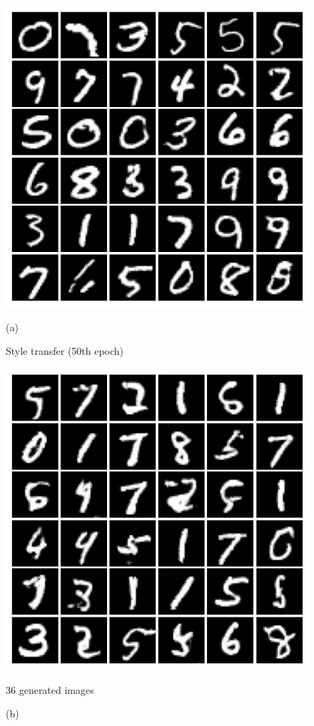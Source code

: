 \documentclass{article}
\begin{document}
\begin{figure}[hbt]
	\centering
	\begin{minipage}{.5\textwidth}
		\centering
		\includegraphics[width=.8\linewidth]{images/mnist_transfer_crisp_50.png}
		\caption{(a)}{Style transfer (50th epoch)}
		\label{fig:sub7}
	\end{minipage}
	\begin{minipage}{.5\textwidth}
		\centering
		\includegraphics[width=.8\linewidth]{images/mnist_generated_crisp_50.png}
		\caption{(b)}{36 generated images}
		\label{fig:sub8}
	\end{minipage}
\end{figure}
\end{document}
